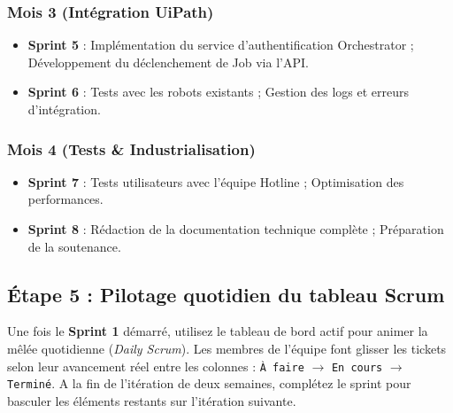 \subsubsection{Mois 3 (Intégration UiPath)}
\begin{itemize}
    \item \textbf{Sprint 5} : Implémentation du service d'authentification Orchestrator ; Développement du déclenchement de Job via l'API.
    \item \textbf{Sprint 6} : Tests avec les robots existants ; Gestion des logs et erreurs d'intégration.
\end{itemize}

\subsubsection{Mois 4 (Tests \& Industrialisation)}
\begin{itemize}
    \item \textbf{Sprint 7} : Tests utilisateurs avec l'équipe Hotline ; Optimisation des performances.
    \item \textbf{Sprint 8} : Rédaction de la documentation technique complète ; Préparation de la soutenance.
\end{itemize}

\subsection{Étape 5 : Pilotage quotidien du tableau Scrum}
Une fois le \textbf{Sprint 1} démarré, utilisez le tableau de bord actif pour animer la mêlée quotidienne (\textit{Daily Scrum}). Les membres de l'équipe font glisser les tickets selon leur avancement réel entre les colonnes : \texttt{À faire} $\rightarrow$ \texttt{En cours} $\rightarrow$ \texttt{Terminé}.
A la fin de l'itération de deux semaines, complétez le sprint pour basculer les éléments restants sur l'itération suivante.
